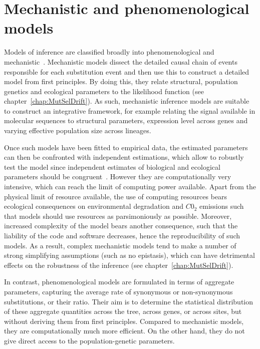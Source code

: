 \section{Mechanistic and phenomenological models}
\label{sec:mechanistic-and-phenomenological-models}

Models of inference are classified broadly into phenomenological and mechanistic~\citep{Rodrigue2010a}.
Mechanistic models dissect the detailed causal chain of events responsible for each substitution event and then use this to construct a detailed model from first principles.
By doing this, they relate structural, population genetics and ecological parameters to the likelihood function (see chapter~\ref{chap:MutSelDrift}).
As such, mechanistic inference models are suitable to construct an integrative framework, for example relating the signal available in molecular sequences to structural parameters, expression level across genes and varying effective population size across lineages.

Once such models have been fitted to empirical data, the estimated parameters can then be confronted with independent estimations, which allow to robustly test the model since independent estimates of biological and ecological parameters should be congruent~\citep{Dasmeh2014}.
However they are computationally very intensive, which can reach the limit of computing power available.
Apart from the physical limit of resource available, the use of computing resources bears ecological consequences on environmental degradation and $C0_2$ emissions such that models should use resources as parsimoniously as possible.
Moreover, increased complexity of the model bears another consequence, such that the liability of the code and software decreases, hence the reproducibility of such models.
As a result, complex mechanistic models tend to make a number of strong simplifying assumptions (such as no epistasis), which can have detrimental effects on the robustness of the inference (see chapter~\ref{chap:MutSelDrift}).

In contrast, phenomenological models are formulated in terms of aggregate parameters, capturing the average rate of synonymous or non-synonymous substitutions, or their ratio.
Their aim is to determine the statistical distribution of these aggregate quantities across the tree, across genes, or across sites, but without deriving them from first principles.
Compared to mechanistic models, they are computationally much more efficient.
On the other hand, they do not give direct access to the population-genetic parameters.

